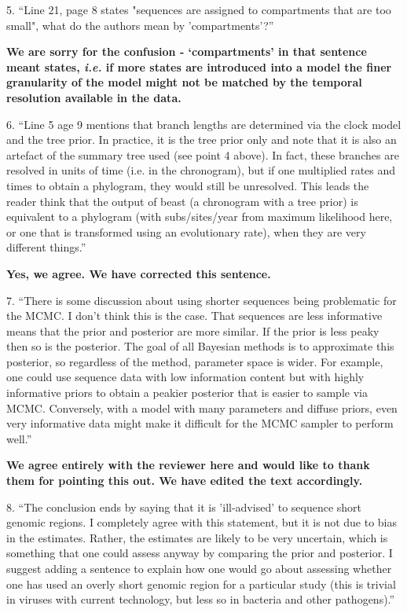 \documentclass[11pt,oneside,letterpaper]{article}
\begin{document}
5. ``Line 21, page 8 states "sequences are assigned to compartments that are too small", what do the authors mean by 'compartments'?''

\textbf{We are sorry for the confusion - `compartments' in that sentence meant states, \textit{i.e.} if more states are introduced into a model the finer granularity of the model might not be matched by the temporal resolution available in the data.}

6. ``Line 5 age 9 mentions that branch lengths are determined via the clock model and the tree prior. In practice, it is the tree prior only and note that it is also an artefact of the summary tree used (see point 4 above). In fact, these branches are resolved in units of time (i.e. in the chronogram), but if one multiplied rates and times to obtain a phylogram, they would still be unresolved. This leads the reader think that the output of beast (a chronogram with a tree prior) is equivalent to a phylogram (with subs/sites/year from maximum likelihood here, or one that is transformed using an evolutionary rate), when they are very different things.''

\textbf{Yes, we agree. We have corrected this sentence.}

7. ``There is some discussion about using shorter sequences being problematic for the MCMC. I don't think this is the case. That sequences are less informative means that the prior and posterior are more similar. If the prior is less peaky then so is the posterior. The goal of all Bayesian methods is to approximate this posterior, so regardless of the method, parameter space is wider. For example, one could use sequence data with low information content but with highly informative priors to obtain a peakier posterior that is easier to sample via MCMC. Conversely, with a model with many parameters and diffuse priors, even very informative data might make it difficult for the MCMC sampler to perform well.''

\textbf{We agree entirely with the reviewer here and would like to thank them for pointing this out. We have edited the text accordingly.}

8. ``The conclusion ends by saying that it is 'ill-advised' to sequence short genomic regions. I completely agree with this statement, but it is not due to bias in the estimates. Rather, the estimates are likely to be very uncertain, which is something that one could assess anyway by comparing the prior and posterior. I suggest adding a sentence to explain how one would go about assessing whether one has used an overly short genomic region for a particular study (this is trivial in viruses with current technology, but less so in bacteria and other pathogens).''
\end{document}
